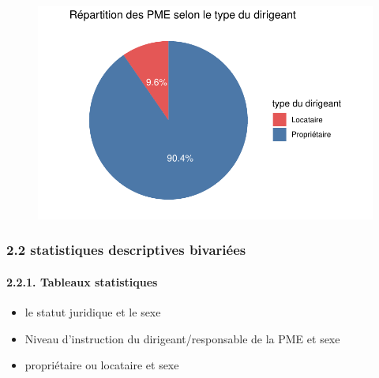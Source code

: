 \documentclass[
  letterpaper,
  DIV=11,
  numbers=noendperiod]{scrartcl}
\let\oldparagraph\paragraph
\renewcommand{\paragraph}[1]{\oldparagraph{#1}\mbox{}}
\begin{document}
\begin{figure}[H]

{\centering \includegraphics{projet_R_files/figure-pdf/unnamed-chunk-23-1.pdf}

}

\end{figure}

\hypertarget{statistiques-descriptives-bivariuxe9es}{%
\subsubsection{2.2 statistiques descriptives
bivariées}\label{statistiques-descriptives-bivariuxe9es}}

\hypertarget{tableaux-statistiques-1}{%
\paragraph{2.2.1. Tableaux statistiques}\label{tableaux-statistiques-1}}

\begin{itemize}
\item
  le statut juridique et le sexe
\item
  Niveau d'instruction du dirigeant/responsable de la PME et sexe
\item
  propriétaire ou locataire et sexe
\end{itemize}
\end{document}
